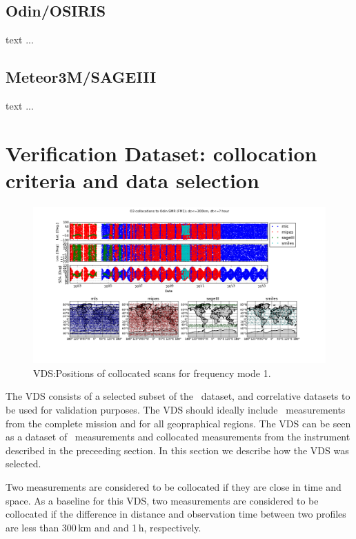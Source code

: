 \subsection{Odin/OSIRIS}
 
text ...

\subsection{Meteor3M/SAGEIII}

text ...


\section{Verification Dataset: collocation criteria and data selection}
\label{sec:vdsselection}

\begin{figure}[t]
\centering
\includegraphics[width=17cm]{test_collocation_fm1.png}
\caption{VDS:Positions of collocated scans for frequency mode 1.}
\label{fig:vdsfm1}
\end{figure}



The VDS consists of a selected subset of the \smr\ dataset, and correlative
datasets to be used for validation purposes. 
The VDS should ideally include \smr\ measurements from    
the complete mission and for all geopraphical regions.
The VDS can be seen as a dataset of \smr\ measurements and
collocated measurements from the instrument described 
in the preceeding section. In this section we describe
how the VDS was selected.

 
Two measurements are considered to be collocated if they
are close in time and space. As a baseline for this VDS,
two measurements are considered to be collocated if the 
difference in distance and observation time between two profiles are 
less than 300\,km and and 1\,h, respectively.

